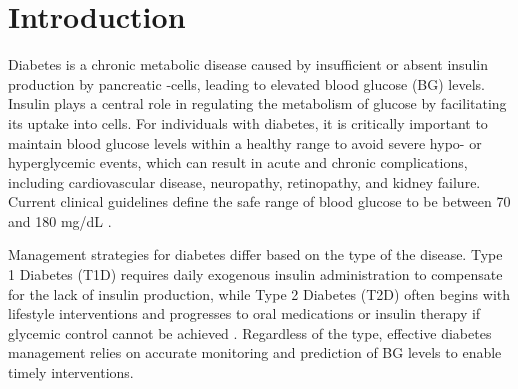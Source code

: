 
\section{Introduction}


Diabetes is a chronic metabolic disease caused by insufficient or absent insulin production by pancreatic -cells, leading to elevated blood glucose (BG) levels. Insulin plays a central role in regulating the metabolism of glucose by facilitating its uptake into cells. For individuals with diabetes, it is critically important to maintain blood glucose levels within a healthy range to avoid severe hypo- or hyperglycemic events, which can result in acute and chronic complications, including cardiovascular disease, neuropathy, retinopathy, and kidney failure\cite{world_health_organization_global_2016}. Current clinical guidelines define the safe range of blood glucose to be between 70 and 180 mg/dL \cite{noauthor_time_2021}.

Management strategies for diabetes differ based on the type of the disease. Type 1 Diabetes (T1D) requires daily exogenous insulin administration to compensate for the lack of insulin production, while Type 2 Diabetes (T2D) often begins with lifestyle interventions and progresses to oral medications or insulin therapy if glycemic control cannot be achieved \cite{bilous_handbook_2021}. Regardless of the type, effective diabetes management relies on accurate monitoring and prediction of BG levels to enable timely interventions.

